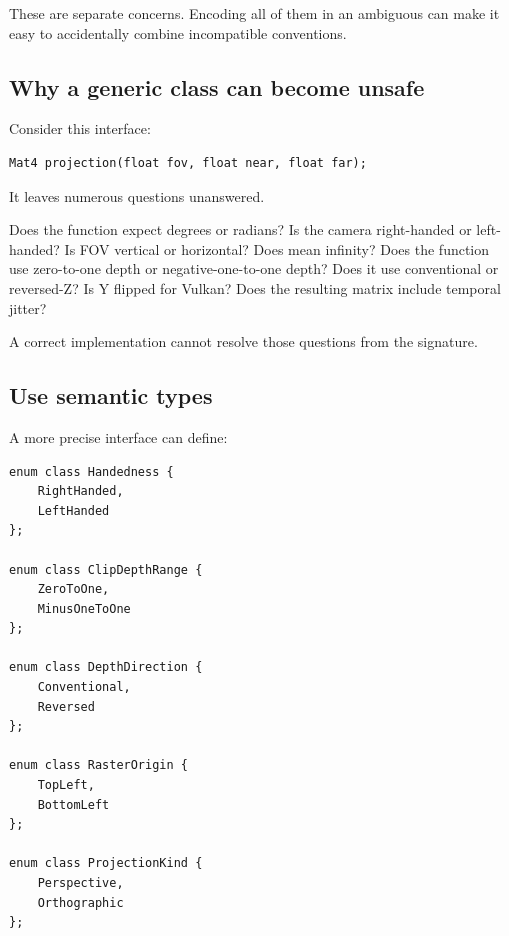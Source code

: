 These are separate concerns. Encoding all of them in an ambiguous  can make it easy to accidentally combine incompatible conventions.

\subsection{\texorpdfstring{Why a generic  class can become unsafe}{Why a generic  class can become unsafe}}\label{02-foundations-ii-ch037-why-a-generic-camera-class-can-become-unsafe}

\hypertarget{02-foundations-ii-ch037-why-a-generic-camera-class-can-become-unsafe}{}

Consider this interface:

\begin{verbatim}
Mat4 projection(float fov, float near, float far);
\end{verbatim}

It leaves numerous questions unanswered.

Does the function expect degrees or radians? Is the camera right-handed or left-handed? Is FOV vertical or horizontal? Does  mean infinity? Does the function use zero-to-one depth or negative-one-to-one depth? Does it use conventional or reversed-Z? Is Y flipped for Vulkan? Does the resulting matrix include temporal jitter?

A correct implementation cannot resolve those questions from the signature.

\subsection{Use semantic types}\label{02-foundations-ii-ch037-use-semantic-types}

\hypertarget{02-foundations-ii-ch037-use-semantic-types}{}

A more precise interface can define:

\begin{verbatim}
enum class Handedness {
    RightHanded,
    LeftHanded
};

enum class ClipDepthRange {
    ZeroToOne,
    MinusOneToOne
};

enum class DepthDirection {
    Conventional,
    Reversed
};

enum class RasterOrigin {
    TopLeft,
    BottomLeft
};

enum class ProjectionKind {
    Perspective,
    Orthographic
};
\end{verbatim}

